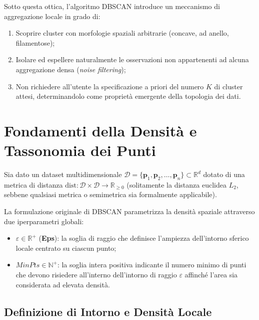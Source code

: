 Sotto questa ottica, l'algoritmo DBSCAN introduce un meccanismo di aggregazione locale in grado di:
\begin{enumerate}
    \item Scoprire cluster con morfologie spaziali arbitrarie (concave, ad anello, filamentose);
    \item Isolare ed espellere naturalmente le osservazioni non appartenenti ad alcuna aggregazione densa (\textit{noise filtering});
    \item Non richiedere all'utente la specificazione a priori del numero $K$ di cluster attesi, determinandolo come proprietà emergente della topologia dei dati.
\end{enumerate}

\FloatBarrier
\section{Fondamenti della Densità e Tassonomia dei Punti}
\label{sec:dm-dbscan-density-taxonomy}

Sia dato un dataset multidimensionale $\mathcal{D} = \{\mathbf{p}_1, \mathbf{p}_2, \dots, \mathbf{p}_n\} \subset \mathbb{R}^d$ dotato di una metrica di distanza $\mathrm{dist}: \mathcal{D} \times \mathcal{D} \to \mathbb{R}_{\ge 0}$ (solitamente la distanza euclidea $L_2$, sebbene qualsiasi metrica o semimetrica sia formalmente applicabile).

La formulazione originale di DBSCAN parametrizza la densità spaziale attraverso due iperparametri globali:
\begin{itemize}
    \item $\varepsilon \in \mathbb{R}^+$ (\textbf{Eps}): la soglia di raggio che definisce l'ampiezza dell'intorno sferico locale centrato su ciascun punto;
    \item $MinPts \in \mathbb{N}^+$: la soglia intera positiva indicante il numero minimo di punti che devono risiedere all'interno dell'intorno di raggio $\varepsilon$ affinché l'area sia considerata ad elevata densità.
\end{itemize}

\FloatBarrier
\subsection{Definizione di Intorno e Densità Locale}

